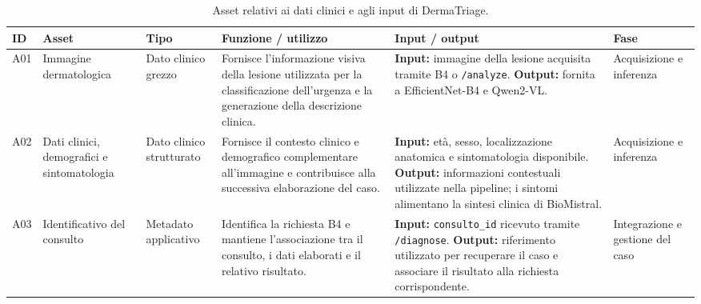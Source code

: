\begin{table}[H]
    \centering
    \small
    \setlength{\tabcolsep}{4pt}
    \renewcommand{\arraystretch}{1.08}

    \begin{tabularx}{\textwidth}{
        >{\raggedright\arraybackslash}p{0.6cm}
        >{\raggedright\arraybackslash}p{2.5cm}
        >{\raggedright\arraybackslash}p{1.6cm}
        X
        X
        >{\raggedright\arraybackslash}p{1.8cm}
    }
        \toprule

        \textbf{ID} &
        \textbf{Asset} &
        \textbf{Tipo} &
        \textbf{Funzione / utilizzo} &
        \textbf{Input / output} &
        \textbf{Fase} \\

        \midrule

        A01 &
        Immagine dermatologica &
        Dato clinico grezzo &
        Fornisce l'informazione visiva della lesione utilizzata per la
        classificazione dell'urgenza e la generazione della descrizione
        clinica. &
        \textbf{Input:} immagine della lesione acquisita tramite B4 o
        \texttt{/analyze}. \textbf{Output:} fornita a EfficientNet-B4 e
        Qwen2-VL. &
        Acquisizione e inferenza \\

        \midrule

        A02 &
        Dati clinici, demografici e sintomatologia &
        Dato clinico strutturato &
        Fornisce il contesto clinico e demografico complementare
        all'immagine e contribuisce alla successiva elaborazione del caso. &
        \textbf{Input:} età, sesso, localizzazione anatomica e
        sintomatologia disponibile. \textbf{Output:} informazioni
        contestuali utilizzate nella pipeline; i sintomi alimentano la
        sintesi clinica di BioMistral. &
        Acquisizione e inferenza \\

        \midrule

        A03 &
        Identificativo del consulto &
        Metadato applicativo &
        Identifica la richiesta B4 e mantiene l'associazione tra il
        consulto, i dati elaborati e il relativo risultato. &
        \textbf{Input:} \texttt{consulto\_id} ricevuto tramite
        \texttt{/diagnose}. \textbf{Output:} riferimento utilizzato per
        recuperare il caso e associare il risultato alla richiesta
        corrispondente. &
        Integrazione e gestione del caso \\

        \bottomrule
    \end{tabularx}

    \caption{Asset relativi ai dati clinici e agli input di DermaTriage.}
    \label{tab:asset-dati-input}
\end{table}

